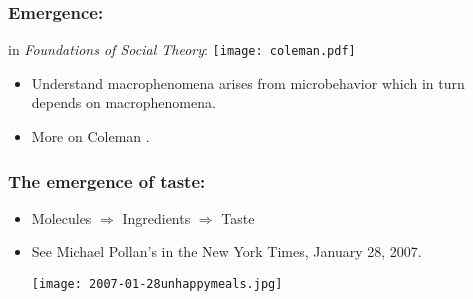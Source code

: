 \begin{frame}
  \frametitle{Emergence:}

  \begin{block}{
      \smallskip
      in \textit{Foundations of Social Theory}:}
    \texttt{[image: coleman.pdf]}
  \end{block}

  \bigskip

  \begin{block}{}
  \begin{itemize}
  \item 
    Understand macrophenomena arises from microbehavior
    which in turn depends on macrophenomena.\cite{coleman1994a}
  \item<2->
    More on Coleman 
    .
  \end{itemize}
  \end{block}

\end{frame}


\begin{frame}
  \frametitle{The emergence of taste:}

  \begin{block}{}
    \begin{itemize}
    \item 
      Molecules $\Rightarrow$ Ingredients $\Rightarrow$ Taste 
    \item 
      See Michael Pollan's
       in the New York Times, January 28, 2007.

      \medskip

      \texttt{[image: 2007-01-28unhappymeals.jpg]}\\
      {\tiny {}}
    \end{itemize}
  \end{block}

\end{frame}


